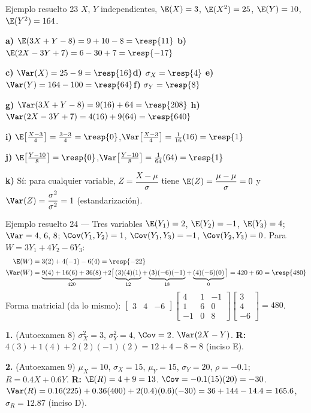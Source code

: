 \begin{ejemplo}{Ejemplo resuelto 23 }
$X$, $Y$ independientes, $\E(X)=3$, $\E(X^2)=25$, $\E(Y)=10$, $\E(Y^2)=164$.

\textbf{a)} $\E(3X+Y-8)=9+10-8=\resp{11}$\qquad
\textbf{b)} $\E(2X-3Y+7)=6-30+7=\resp{-17}$

\textbf{c)} $\Var(X)=25-9=\resp{16}$\quad \textbf{d)} $\sigma_X=\resp{4}$\quad
\textbf{e)} $\Var(Y)=164-100=\resp{64}$\quad \textbf{f)} $\sigma_Y=\resp{8}$

\textbf{g)} $\Var(3X+Y-8)=9(16)+64=\resp{208}$\qquad
\textbf{h)} $\Var(2X-3Y+7)=4(16)+9(64)=\resp{640}$

\textbf{i)} $\E\big[\tfrac{X-3}{4}\big]=\tfrac{3-3}{4}=\resp{0}$,\quad $\Var\big[\tfrac{X-3}{4}\big]=\tfrac{1}{16}(16)=\resp{1}$

\textbf{j)} $\E\big[\tfrac{Y-10}{8}\big]=\resp{0}$,\quad $\Var\big[\tfrac{Y-10}{8}\big]=\tfrac1{64}(64)=\resp{1}$

\textbf{k)} S\'i: para cualquier variable, $Z=\dfrac{X-\mu}{\sigma}$ tiene
$\E(Z)=\dfrac{\mu-\mu}{\sigma}=0$ y $\Var(Z)=\dfrac{\sigma^2}{\sigma^2}=1$ (estandarizaci\'on).
\end{ejemplo}

\begin{ejemplo}{Ejemplo resuelto 24 --- Tres variables }
$\E(Y_1)=2$, $\E(Y_2)=-1$, $\E(Y_3)=4$; $\Var=4,\,6,\,8$; $\Cov(Y_1,Y_2)=1$, $\Cov(Y_1,Y_3)=-1$, $\Cov(Y_2,Y_3)=0$.
Para $W=3Y_1+4Y_2-6Y_3$:
\begin{align*}
\E(W)&=3(2)+4(-1)-6(4)=\resp{-22}\\
\Var(W)&=\underbrace{9(4)+16(6)+36(8)}_{420}+2\big[\underbrace{(3)(4)(1)}_{12}+\underbrace{(3)(-6)(-1)}_{18}+\underbrace{(4)(-6)(0)}_{0}\big]=420+60=\resp{480}
\end{align*}
Forma matricial (da lo mismo):
$\begin{bmatrix}3&4&-6\end{bmatrix}
\begin{bmatrix}4&1&-1\\1&6&0\\-1&0&8\end{bmatrix}
\begin{bmatrix}3\\4\\-6\end{bmatrix}=480$.
\end{ejemplo}

\begin{mecaniza}
\textbf{1.} (Autoexamen 8) $\sigma_X^2=3$, $\sigma_Y^2=4$, $\Cov=2$. $\Var(2X-Y)$.
\quad\textbf{R:} $4(3)+1(4)+2(2)(-1)(2)=12+4-8=8$ (inciso E).

\textbf{2.} (Autoexamen 9) $\mu_X=10$, $\sigma_X=15$, $\mu_Y=15$, $\sigma_Y=20$, $\rho=-0.1$; $R=0.4X+0.6Y$.
\quad\textbf{R:} $\E(R)=4+9=13$. $\Cov=-0.1(15)(20)=-30$.
$\Var(R)=0.16(225)+0.36(400)+2(0.4)(0.6)(-30)=36+144-14.4=165.6$, $\sigma_R=12.87$ (inciso D).
\end{mecaniza}

